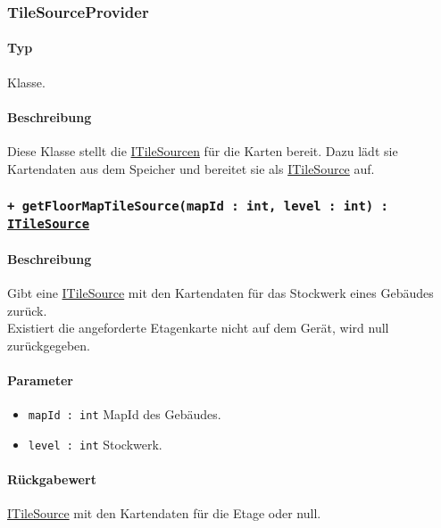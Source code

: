 \subsubsection{TileSourceProvider}
\paragraph*{Typ}
Klasse.
\paragraph*{Beschreibung}
Diese Klasse stellt die \href{https://osmdroid.github.io/osmdroid/javadocAll/org/osmdroid/tileprovider/tilesource/ITileSource.html}
{ITileSourcen} für die Karten bereit. Dazu lädt sie Kartendaten aus dem Speicher und bereitet sie als 
\href{https://osmdroid.github.io/osmdroid/javadocAll/org/osmdroid/tileprovider/tilesource/ITileSource.html}
{ITileSource} auf.

\subsubsection*{\texttt{+ getFloorMapTileSource(mapId : int, level : int) : \href{https://osmdroid.github.io/osmdroid/javadocAll/org/osmdroid/tileprovider/tilesource/ITileSource.html}
{ITileSource}}}%
\paragraph*{Beschreibung}
Gibt eine \href{https://osmdroid.github.io/osmdroid/javadocAll/org/osmdroid/tileprovider/tilesource/ITileSource.html}
{ITileSource} mit den Kartendaten für das Stockwerk eines Gebäudes zurück.\\
Existiert die angeforderte Etagenkarte nicht auf dem Gerät, wird null zurückgegeben.
\paragraph*{Parameter}
\begin{itemize}
    \item \texttt{mapId : int} MapId des Gebäudes.
    \item \texttt{level : int} Stockwerk.
\end{itemize}
\paragraph*{Rückgabewert}
\href{https://osmdroid.github.io/osmdroid/javadocAll/org/osmdroid/tileprovider/tilesource/ITileSource.html}
{ITileSource} mit den Kartendaten für die Etage oder null.

